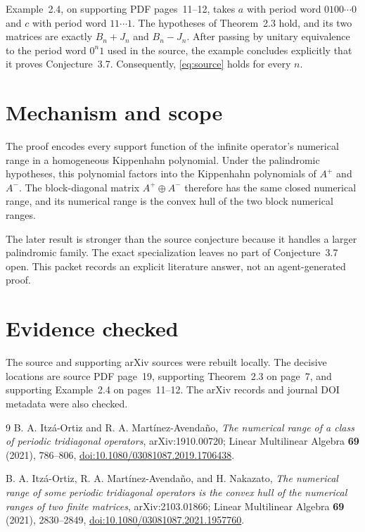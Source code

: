 \documentclass[11pt]{article}
\begin{document}
Example~2.4, on supporting PDF pages~11--12, takes $a$ with period word
$0100\cdots0$ and $c$ with period word $11\cdots1$.  The hypotheses of
Theorem~2.3 hold, and its two matrices are exactly $B_n+J_n$ and $B_n-J_n$.
After passing by unitary equivalence to the period word $0^n1$ used in the
source, the example concludes explicitly that it proves Conjecture~3.7.
Consequently, \eqref{eq:source} holds for every $n$.

\section*{Mechanism and scope}
The proof encodes every support function of the infinite operator's numerical
range in a homogeneous Kippenhahn polynomial.  Under the palindromic
hypotheses, this polynomial factors into the Kippenhahn polynomials of
$A^+$ and $A^-$.  The block-diagonal matrix $A^+\oplus A^-$ therefore has the
same closed numerical range, and its numerical range is the convex hull of the
two block numerical ranges.

The later result is stronger than the source conjecture because it handles a
larger palindromic family.  The exact specialization leaves no part of
Conjecture~3.7 open.  This packet records an explicit literature answer, not an
agent-generated proof.

\section*{Evidence checked}
The source and supporting arXiv sources were rebuilt locally.  The decisive
locations are source PDF page~19, supporting Theorem~2.3 on page~7, and
supporting Example~2.4 on pages~11--12.  The arXiv records and journal DOI
metadata were also checked.

{\raggedright
\begin{thebibliography}{9}
B. A. Itzá-Ortiz and R. A. Martínez-Avendaño,
\emph{The numerical range of a class of periodic tridiagonal operators},
arXiv:1910.00720; Linear Multilinear Algebra \textbf{69} (2021), 786--806,
\href{https://doi.org/10.1080/03081087.2019.1706438}{doi:10.1080/03081087.2019.1706438}.

B. A. Itzá-Ortiz, R. A. Martínez-Avendaño, and H. Nakazato,
\emph{The numerical range of some periodic tridiagonal operators is the
convex hull of the numerical ranges of two finite matrices},
arXiv:2103.01866; Linear Multilinear Algebra \textbf{69} (2021), 2830--2849,
\href{https://doi.org/10.1080/03081087.2021.1957760}{doi:10.1080/03081087.2021.1957760}.
\end{thebibliography}
\par}
\end{document}
